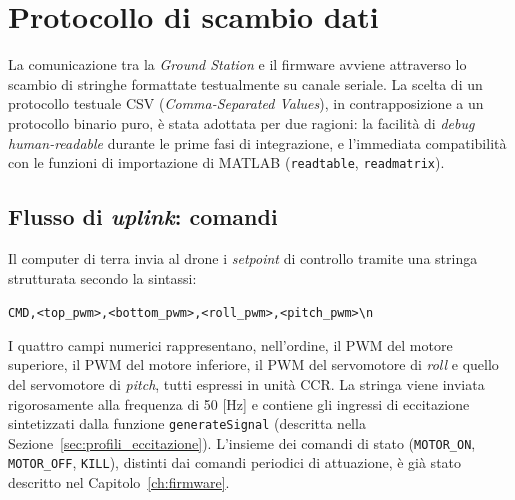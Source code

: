 \documentclass[11pt]{report}
\begin{document}
	\section{Protocollo di scambio dati}
	\label{sec:protocollo_scambio}
	
	La comunicazione tra la \textit{Ground Station} e il firmware avviene attraverso lo scambio di stringhe formattate testualmente su canale seriale. La scelta di un protocollo testuale CSV (\textit{Comma-Separated Values}), in contrapposizione a un protocollo binario puro, è stata adottata per due ragioni: la facilità di \textit{debug} \textit{human-readable} durante le prime fasi di integrazione, e l'immediata compatibilità con le funzioni di importazione di MATLAB (\texttt{readtable}, \texttt{readmatrix}).
	
	\subsection{Flusso di \textit{uplink}: comandi}
	Il computer di terra invia al drone i \textit{setpoint} di controllo tramite una stringa strutturata secondo la sintassi:
	\begin{center}
		\texttt{CMD,<top\_pwm>,<bottom\_pwm>,<roll\_pwm>,<pitch\_pwm>\textbackslash n}
	\end{center}
	I quattro campi numerici rappresentano, nell'ordine, il PWM del motore superiore, il PWM del motore inferiore, il PWM del servomotore di \textit{roll} e quello del servomotore di \textit{pitch}, tutti espressi in unità CCR. La stringa viene inviata rigorosamente alla frequenza di 50 [Hz] e contiene gli ingressi di eccitazione sintetizzati dalla funzione \texttt{generateSignal} (descritta nella Sezione~\ref{sec:profili_eccitazione}). L'insieme dei comandi di stato (\texttt{MOTOR\_ON}, \texttt{MOTOR\_OFF}, \texttt{KILL}), distinti dai comandi periodici di attuazione, è già stato descritto nel Capitolo~\ref{ch:firmware}.
	
\end{document}
